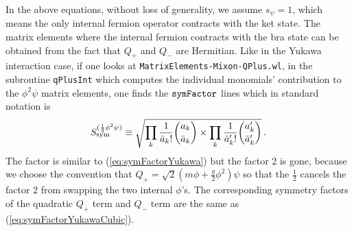 \documentclass[12pt]{article}
\newcommand{\be}{\begin{eqnarray}}
\newcommand{\ee}{\end{eqnarray}}
\newcommand{\nn}{\nonumber}
\begin{document}
In the above equations, without loss of generality, we assume $s_{\psi} = 1$, which means the only internal fermion operator contracts with the ket state. The matrix elements where the internal fermion contracts with the bra state can be obtained from the fact that $Q_+$ and $Q_-$ are Hermitian. Like in the Yukawa interaction case, 
if one looks at {\tt MatrixElements-Mixon-QPlus.wl}, in the subroutine {\tt qPlusInt} which computes the individual monomials' contribution to the $\phi^2\psi$ matrix elements, one finds the ${\tt symFactor}$ lines which in standard notation is
\be
S_{\rm sym}^{(\frac{1}{2}\phi^2\psi)} \equiv    \sqrt{ 
    \prod_{k} \frac{1}{\bar a_k!} \binom{a_k}{\bar a_k}  \times
    \prod_{k} \frac{1}{\bar a_k^\prime!}\binom{a_k^\prime}{\bar a_k^\prime}
    } \, .
\ee
The factor is similar to (\ref{eq:symFactorYukawa}) but the factor 2 is gone, because we 
choose the convention that $Q_+ = \sqrt{2}\left( m\phi + \frac{g}{2}\phi^2 \right)\psi$ so that the $\frac{1}{2}$ cancels the factor 2 from swapping the two internal $\phi$'s. The corresponding symmetry factors of the quadratic $Q_+$ term and $Q_-$ term are the same as (\ref{eq:symFactorYukawaCubic}).

\end{document}

